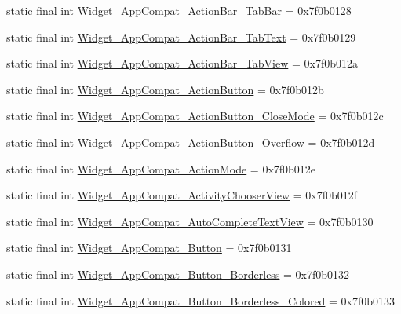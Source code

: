 \begin{CompactItemize}
\item 
static final int \hyperlink{classandroid_1_1support_1_1v7_1_1mediarouter_1_1_r_1_1style_7f55a242c3d26a7a4404e70d98f3869a}{Widget\_\-AppCompat\_\-ActionBar\_\-TabBar} = 0x7f0b0128
\item 
static final int \hyperlink{classandroid_1_1support_1_1v7_1_1mediarouter_1_1_r_1_1style_f02589189c54fc891ec15a4d3467c6a6}{Widget\_\-AppCompat\_\-ActionBar\_\-TabText} = 0x7f0b0129
\item 
static final int \hyperlink{classandroid_1_1support_1_1v7_1_1mediarouter_1_1_r_1_1style_18e1fa29cdc5012c6e2ba3870ceee351}{Widget\_\-AppCompat\_\-ActionBar\_\-TabView} = 0x7f0b012a
\item 
static final int \hyperlink{classandroid_1_1support_1_1v7_1_1mediarouter_1_1_r_1_1style_733b720e88af2d772671471d851b4362}{Widget\_\-AppCompat\_\-ActionButton} = 0x7f0b012b
\item 
static final int \hyperlink{classandroid_1_1support_1_1v7_1_1mediarouter_1_1_r_1_1style_41685edc55a8e2f7ceaa338b9bf076e9}{Widget\_\-AppCompat\_\-ActionButton\_\-CloseMode} = 0x7f0b012c
\item 
static final int \hyperlink{classandroid_1_1support_1_1v7_1_1mediarouter_1_1_r_1_1style_77ebaf947f54a9a8e191628c6f9b40a1}{Widget\_\-AppCompat\_\-ActionButton\_\-Overflow} = 0x7f0b012d
\item 
static final int \hyperlink{classandroid_1_1support_1_1v7_1_1mediarouter_1_1_r_1_1style_d85512802a521c748980d73d9bca16ad}{Widget\_\-AppCompat\_\-ActionMode} = 0x7f0b012e
\item 
static final int \hyperlink{classandroid_1_1support_1_1v7_1_1mediarouter_1_1_r_1_1style_afe1ab621570eee0aeabc9151eb0c631}{Widget\_\-AppCompat\_\-ActivityChooserView} = 0x7f0b012f
\item 
static final int \hyperlink{classandroid_1_1support_1_1v7_1_1mediarouter_1_1_r_1_1style_2f12d6ea98abafa315e7e305de2e9521}{Widget\_\-AppCompat\_\-AutoCompleteTextView} = 0x7f0b0130
\item 
static final int \hyperlink{classandroid_1_1support_1_1v7_1_1mediarouter_1_1_r_1_1style_c1eb801b0bcecc5137073e2a639d06fe}{Widget\_\-AppCompat\_\-Button} = 0x7f0b0131
\item 
static final int \hyperlink{classandroid_1_1support_1_1v7_1_1mediarouter_1_1_r_1_1style_14858100583621ef220728d509ccd5b7}{Widget\_\-AppCompat\_\-Button\_\-Borderless} = 0x7f0b0132
\item 
static final int \hyperlink{classandroid_1_1support_1_1v7_1_1mediarouter_1_1_r_1_1style_154190bccd42246555e90816cc4ceea5}{Widget\_\-AppCompat\_\-Button\_\-Borderless\_\-Colored} = 0x7f0b0133

\end{CompactItemize}
